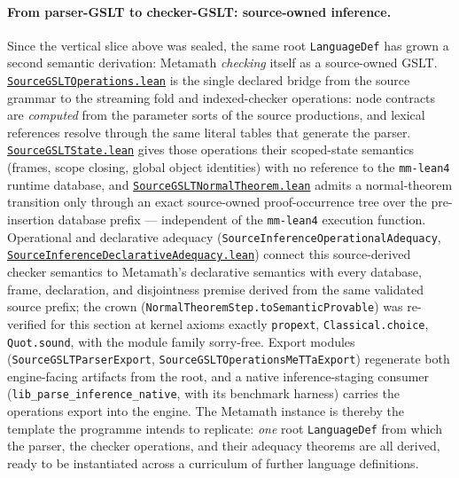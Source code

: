 \documentclass[11pt]{article}
\newcommand{\code}[1]{\texttt{#1}}
\begin{document}
\paragraph{From parser-GSLT to checker-GSLT: source-owned inference.}
Since the vertical slice above was sealed, the same root \code{LanguageDef} has
grown a second semantic derivation: Metamath \emph{checking} itself as a
source-owned GSLT.
\href{https://github.com/zariuq/MeTTapedia/blob/main/lean/mettapedia/Mettapedia/Languages/Metamath/SourceGSLTOperations.lean}{\code{SourceGSLTOperations.lean}}
is the single declared bridge from the source grammar to the streaming
fold and indexed-checker operations: node contracts are \emph{computed}
from the parameter sorts of the source productions, and lexical references
resolve through the same literal tables that generate the parser.
\href{https://github.com/zariuq/MeTTapedia/blob/main/lean/mettapedia/Mettapedia/Languages/Metamath/SourceGSLTState.lean}{\code{SourceGSLTState.lean}}
gives those operations their scoped-state semantics (frames, scope
closing, global object identities) with no reference to the
\code{mm-lean4} runtime database, and
\href{https://github.com/zariuq/MeTTapedia/blob/main/lean/mettapedia/Mettapedia/Languages/Metamath/SourceGSLTNormalTheorem.lean}{\code{SourceGSLTNormalTheorem.lean}}
admits a normal-theorem transition only through an exact source-owned
proof-occurrence tree over the pre-insertion database prefix ---
independent of the \code{mm-lean4} execution function.  Operational and
declarative adequacy
(\code{SourceInferenceOperationalAdequacy},
\href{https://github.com/zariuq/MeTTapedia/blob/main/lean/mettapedia/Mettapedia/Languages/Metamath/SourceInferenceDeclarativeAdequacy.lean}{\code{SourceInferenceDeclarativeAdequacy.lean}})
connect this source-derived checker semantics to Metamath's declarative
semantics with every database, frame, declaration, and disjointness
premise derived from the same validated source prefix; the crown
(\code{NormalTheoremStep.toSemanticProvable}) was re-verified for this
section at kernel axioms exactly \code{propext}, \code{Classical.choice},
\code{Quot.sound}, with the module family sorry-free.  Export modules
(\code{SourceGSLTParserExport}, \code{SourceGSLTOperationsMeTTaExport})
regenerate both engine-facing artifacts from the root, and a native
inference-staging consumer (\code{lib\_parse\_inference\_native}, with its
benchmark harness) carries the operations export into the engine.  The
Metamath instance is thereby the template the programme intends to
replicate: \emph{one} root \code{LanguageDef} from which the parser, the checker
operations, and their adequacy theorems are all derived, ready to be
instantiated across a curriculum of further language definitions.
\end{document}
